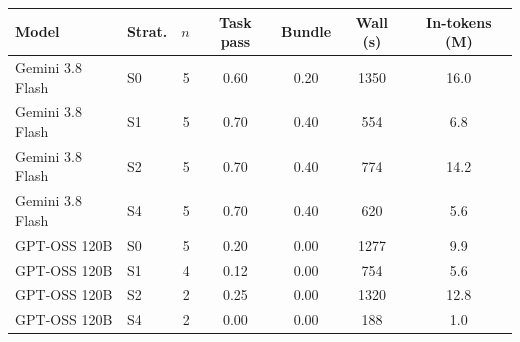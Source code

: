 \begin{tabular}{@{}llrcccc@{}}
\toprule
Model & Strat. & $n$ & Task pass & Bundle & Wall (s) & In-tokens (M) \\
\midrule
Gemini 3.8 Flash & S0 & 5 & 0.60 & 0.20 & 1350 & 16.0 \\
Gemini 3.8 Flash & S1 & 5 & 0.70 & 0.40 & 554 & 6.8 \\
Gemini 3.8 Flash & S2 & 5 & 0.70 & 0.40 & 774 & 14.2 \\
Gemini 3.8 Flash & S4 & 5 & 0.70 & 0.40 & 620 & 5.6 \\
\midrule
GPT-OSS 120B & S0 & 5 & 0.20 & 0.00 & 1277 & 9.9 \\
GPT-OSS 120B & S1 & 4 & 0.12 & 0.00 & 754 & 5.6 \\
GPT-OSS 120B & S2 & 2 & 0.25 & 0.00 & 1320 & 12.8 \\
GPT-OSS 120B & S4 & 2 & 0.00 & 0.00 & 188 & 1.0 \\
\bottomrule
\end{tabular}

